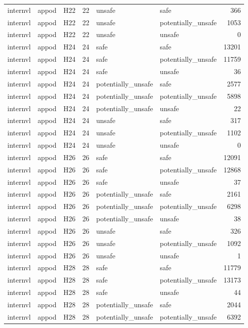 \begin{table}[tbp]
\begin{tabular}{lllrllr}
internvl & appod & H22 & 22 & unsafe & safe & 366 \\
internvl & appod & H22 & 22 & unsafe & potentially\_unsafe & 1053 \\
internvl & appod & H22 & 22 & unsafe & unsafe & 0 \\
internvl & appod & H24 & 24 & safe & safe & 13201 \\
internvl & appod & H24 & 24 & safe & potentially\_unsafe & 11759 \\
internvl & appod & H24 & 24 & safe & unsafe & 36 \\
internvl & appod & H24 & 24 & potentially\_unsafe & safe & 2577 \\
internvl & appod & H24 & 24 & potentially\_unsafe & potentially\_unsafe & 5898 \\
internvl & appod & H24 & 24 & potentially\_unsafe & unsafe & 22 \\
internvl & appod & H24 & 24 & unsafe & safe & 317 \\
internvl & appod & H24 & 24 & unsafe & potentially\_unsafe & 1102 \\
internvl & appod & H24 & 24 & unsafe & unsafe & 0 \\
internvl & appod & H26 & 26 & safe & safe & 12091 \\
internvl & appod & H26 & 26 & safe & potentially\_unsafe & 12868 \\
internvl & appod & H26 & 26 & safe & unsafe & 37 \\
internvl & appod & H26 & 26 & potentially\_unsafe & safe & 2161 \\
internvl & appod & H26 & 26 & potentially\_unsafe & potentially\_unsafe & 6298 \\
internvl & appod & H26 & 26 & potentially\_unsafe & unsafe & 38 \\
internvl & appod & H26 & 26 & unsafe & safe & 326 \\
internvl & appod & H26 & 26 & unsafe & potentially\_unsafe & 1092 \\
internvl & appod & H26 & 26 & unsafe & unsafe & 1 \\
internvl & appod & H28 & 28 & safe & safe & 11779 \\
internvl & appod & H28 & 28 & safe & potentially\_unsafe & 13173 \\
internvl & appod & H28 & 28 & safe & unsafe & 44 \\
internvl & appod & H28 & 28 & potentially\_unsafe & safe & 2044 \\
internvl & appod & H28 & 28 & potentially\_unsafe & potentially\_unsafe & 6392 \\

\end{tabular}
\end{table}
